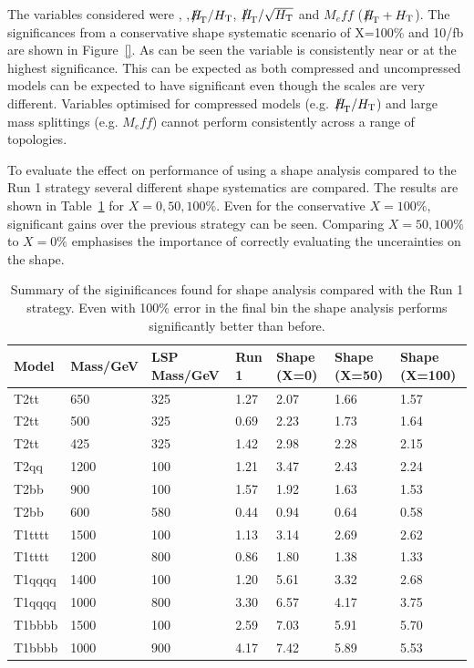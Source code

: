 The variables considered were \alphat, \mht,$\mht/\scalht$, $\mht/\sqrt{\scalht}$ and 
$M_eff$ ($\mht+\scalht$). The significances from a conservative shape systematic 
scenario of X=100\% and 10/fb are shown in Figure~\ref{}. 
As can be seen the \mht variable is consistently near or at the highest 
significance. This can be expected as both compressed and uncompressed models can be expected 
to have significant \mht even though the \scalht scales are very different. Variables optimised
for compressed models (e.g. $\mht/\scalht$) and large mass splittings (e.g. $M_eff$) cannot perform consistently
across a range of topologies.

To evaluate the effect on performance of using a shape analysis compared to the
Run 1 strategy several different shape systematics are compared. The results 
are shown in Table~\ref{table:syst} for $X = 0,50,100\%$. Even for the conservative
$X=100\%$, significant gains over the previous strategy can be seen. Comparing
$X=50,100\%$ to $X=0\%$ emphasises the importance of correctly evaluating the 
uncerainties on the shape.

\begin{table}[!h]
  \label{table:syst}
  \caption{Summary of the siginificances found for shape analysis compared
    with the Run 1 strategy. Even with 100\% error in the final bin
  the shape analysis performs significantly better than before.}
  \centering
  \footnotesize
  \begin{tabular}{ l | l | l | l | l | l | l }
    Model & Mass/GeV & LSP Mass/GeV & Run 1 & Shape (X=0) & Shape (X=50) & Shape (X=100) \\ \hline
    T2tt & 650 & 325 & 1.27 & 2.07& 1.66 & 1.57 \\ 
    T2tt & 500 & 325 & 0.69 & 2.23 & 1.73 & 1.64 \\ 
    T2tt & 425 & 325 & 1.42 & 2.98 & 2.28 & 2.15 \\ 
    T2qq & 1200 & 100 & 1.21 & 3.47 & 2.43 & 2.24 \\ 
    T2bb & 900 & 100 & 1.57 & 1.92 & 1.63 & 1.53 \\ 
    T2bb & 600 & 580 & 0.44 & 0.94 & 0.64 & 0.58 \\ 
    T1tttt & 1500 & 100 & 1.13 & 3.14 & 2.69 & 2.62 \\ 
    T1tttt & 1200 & 800 & 0.86 & 1.80& 1.38 & 1.33 \\ 
    T1qqqq & 1400 & 100 & 1.20 & 5.61 & 3.32 & 2.68 \\ 
    T1qqqq & 1000 & 800 & 3.30 & 6.57 & 4.17 & 3.75 \\ 
    T1bbbb & 1500 & 100 & 2.59 & 7.03 & 5.91 & 5.70 \\ 
    T1bbbb & 1000 & 900 & 4.17 & 7.42 & 5.89 & 5.53 \\ 
  \end{tabular}
\end{table}

